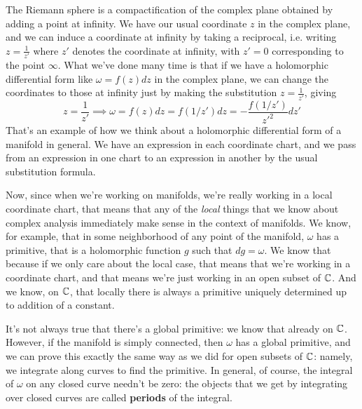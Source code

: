 \documentclass{article}
\begin{document}
The Riemann sphere is a compactification of the complex plane obtained by adding a point at infinity. We have our usual coordinate \(z\) in the complex plane, and we can induce a coordinate at infinity by taking a reciprocal, i.e. writing \(z = \frac{1}{z'}\) where \(z'\) denotes the coordinate at infinity, with \(z' = 0\) corresponding to the point \(\infty\). What we've done many time is that if we have a holomorphic differential form like \(\omega = f(z)dz\) in the complex plane, we can change the coordinates to those at infinity just by making the substitution \(z = \frac{1}{z'}\), giving
\begin{equation}
  z = \frac{1}{z'} \implies \omega = f(z)dz = f(1/z')dz = -\frac{f(1/z')}{z'^2}dz'
\end{equation}
That's an example of how we think about a holomorphic differential form of a manifold in general. We have an expression in each coordinate chart, and we pass from an expression in one chart to an expression in another by the usual substitution formula.

Now, since when we're working on manifolds, we're really working in a local coordinate chart, that means that any of the \textit{local} things that we know about complex analysis immediately make sense in the context of manifolds. We know, for example, that in some neighborhood of any point of the manifold, \(\omega\) has a primitive, that is a holomorphic function \(g\) such that \(dg = \omega\). We know that because if we only care about the local case, that means that we're working in a coordinate chart, and that means we're just working in an open subset of \(\mathbb{C}\). And we know, on \(\mathbb{C}\), that locally there is always a primitive uniquely determined up to addition of a constant.

It's not always true that there's a global primitive: we know that already on \(\mathbb{C}\). However, if the manifold is simply connected, then \(\omega\) has a global primitive, and we can prove this exactly the same way as we did for open subsets of \(\mathbb{C}\): namely, we integrate along curves to find the primitive. In general, of course, the integral of \(\omega\) on any closed curve needn't be zero: the objects that we get by integrating over closed curves are called \textbf{periods} of the integral.
\end{document}
